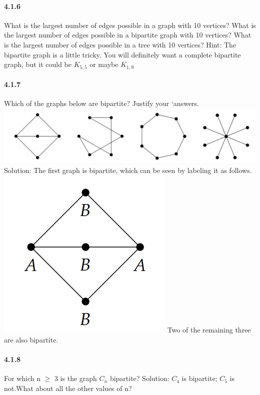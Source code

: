 \documentclass{article}
\begin{document}
\paragraph{4.1.6}
What is the largest number of edges possible in a graph with 10 vertices? What is the largest number of edges possible in a bipartite graph with 10 vertices? What is the largest number of edges possible in a tree with 10 vertices?\newline
Hint:\newline
The bipartite graph is a little tricky. You will definitely want a
complete bipartite graph, but it could be $K_{5,5}$ or maybe $K_{1,9}$
\paragraph{4.1.7}
Which of the graphs below are bipartite? Justify your `answers.\newline
\includegraphics{0041}\newline
Solution:\newline
The first graph is bipartite, which can be seen by labeling it as follows.\newline
\includegraphics{0052}\newline
Two of the remaining three are also bipartite.
\paragraph{4.1.8}
For which n $\ge$ 3 is the graph $C_n$ bipartite?
Solution:\newline
$C_4$ is bipartite; $C_5$ is not.What about all the other values of n?
\end{document}
